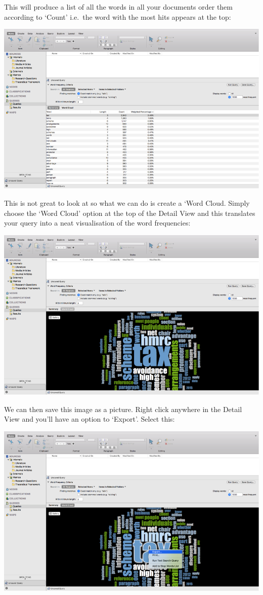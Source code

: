 \documentclass[]{book}
\theoremstyle{definition}
\theoremstyle{definition}
\theoremstyle{definition}
\theoremstyle{remark}
\begin{document}
This will produce a list of all the words in all your documents order
them according to `Count' i.e.~the word with the most hits appears at
the top:

\includegraphics{imgs/qual_23.png}

This is not great to look at so what we can do is create a `Word Cloud.
Simply choose the `Word Cloud' option at the top of the Detail View and
this translates your query into a neat visualisation of the word
frequencies:

\includegraphics{imgs/qual_24.png}

We can then save this image as a picture. Right click anywhere in the
Detail View and you'll have an option to `Export'. Select this:

\includegraphics{imgs/qual_25.png}
\end{document}
